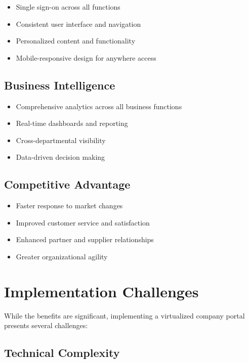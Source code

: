 \begin{itemize}
	\item Single sign-on across all functions
	\item Consistent user interface and navigation
	\item Personalized content and functionality
	\item Mobile-responsive design for anywhere access
\end{itemize}

\subsection{Business Intelligence}

\begin{itemize}
	\item Comprehensive analytics across all business functions
	\item Real-time dashboards and reporting
	\item Cross-departmental visibility
	\item Data-driven decision making
\end{itemize}

\subsection{Competitive Advantage}

\begin{itemize}
	\item Faster response to market changes
	\item Improved customer service and satisfaction
	\item Enhanced partner and supplier relationships
	\item Greater organizational agility
\end{itemize}

\section{Implementation Challenges}
\label{sec:implementation-challenges}

While the benefits are significant, implementing a virtualized company portal presents several challenges:

\subsection{Technical Complexity}

